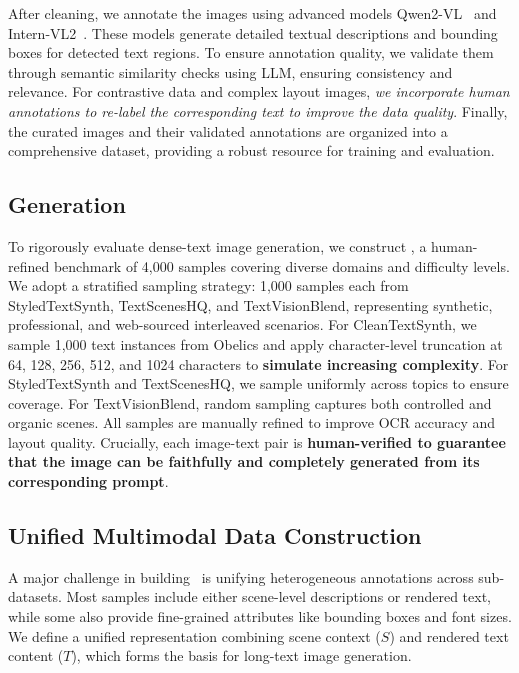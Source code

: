 After cleaning, we annotate the images using advanced models Qwen2-VL~\cite{qwen2_vl} and Intern-VL2~\cite{internvl}. 
These models generate detailed textual descriptions and bounding boxes for detected text regions. 
To ensure annotation quality, we validate them through semantic similarity checks using LLM, ensuring consistency and relevance.
For contrastive data and complex layout images, \textit{we incorporate human annotations to re-label the corresponding text to improve the data quality}.
Finally, the curated images and their validated annotations are organized into a comprehensive dataset, providing a robust resource for training and evaluation.


\subsection{\EvalDatasetName Generation}

To rigorously evaluate dense-text image generation, we construct \EvalDatasetName, a human-refined benchmark of 4,000 samples covering diverse domains and difficulty levels. 
We adopt a stratified sampling strategy: 1,000 samples each from StyledTextSynth, TextScenesHQ, and TextVisionBlend, representing synthetic, professional, and web-sourced interleaved scenarios. For CleanTextSynth, we sample 1,000 text instances from Obelics and apply character-level truncation at 64, 128, 256, 512, and 1024 characters to \textbf{simulate increasing complexity}.
For StyledTextSynth and TextScenesHQ, we sample uniformly across topics to ensure coverage. For TextVisionBlend, random sampling captures both controlled and organic scenes. All samples are manually refined to improve OCR accuracy and layout quality. 
Crucially, each image-text pair is \textbf{human-verified to guarantee that the image can be faithfully and completely generated from its corresponding prompt}.


\subsection{Unified Multimodal Data Construction}

A major challenge in building \DatasetName\ is unifying heterogeneous annotations across sub-datasets. 
Most samples include either scene-level descriptions or rendered text, while some also provide fine-grained attributes like bounding boxes and font sizes. 
We define a unified representation combining scene context ($S$) and rendered text content ($T$), which forms the basis for long-text image generation.

